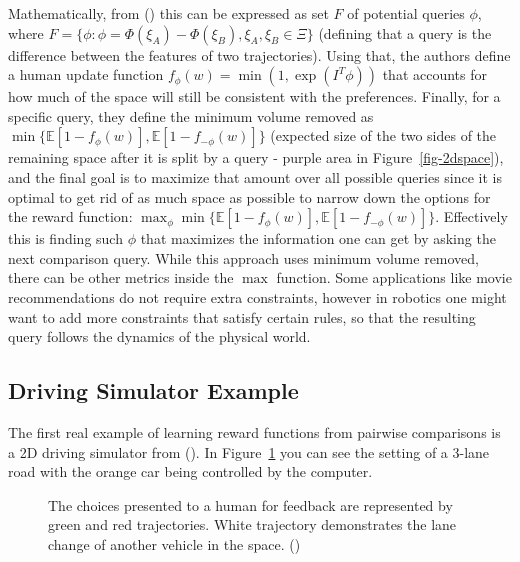 \documentclass[
  letterpaper,
  numbers=noenddot,
  DIV=11,
  oneside]{scrreprt}
\theoremstyle{remark}
\begin{document}
Mathematically, from () this can be expressed as set \(F\) of potential queries \(\phi\),
where
\(F = \{\phi: \phi = \Phi(\xi_A) - \Phi(\xi_B), \xi_A, \xi_B \in \Xi\}\)
(defining that a query is the difference between the features of two
trajectories). Using that, the authors define a human update function
\(f_{\phi}(w) = \min(1, \exp(I^T\phi))\) that accounts for how much of
the space will still be consistent with the preferences. Finally, for a
specific query, they define the minimum volume removed as
\(\min\{\mathbb{E}[1 - f_{\phi}(w)], \mathbb{E}[1 - f_{-\phi}(w)]\}\)
(expected size of the two sides of the remaining space after it is split
by a query - purple area in Figure~\ref{fig-2dspace}), and the final
goal is to maximize that amount over all possible queries since it is
optimal to get rid of as much space as possible to narrow down the
options for the reward function:
\(\max_{\phi} \min\{ \mathbb{E}[1 - f_{\phi}(w)], \mathbb{E}[1 - f_{-\phi}(w)]\}\).
Effectively this is finding such \(\phi\) that maximizes the information
one can get by asking the next comparison query. While this approach
uses minimum volume removed, there can be other metrics inside the
\(\max\) function. Some applications like movie recommendations do not
require extra constraints, however in robotics one might want to add
more constraints that satisfy certain rules, so that the resulting query
follows the dynamics of the physical world.

\subsection{Driving Simulator Example}\label{driving-simulator-example}

The first real example of learning reward functions from pairwise
comparisons is a 2D driving simulator from
(). In
Figure~\ref{fig-car_direct} you can see the setting of a 3-lane road
with the orange car being controlled by the computer.

\begin{figure}


\caption{\label{fig-car_direct}The choices presented to a human for
feedback are represented by green and red trajectories. White trajectory
demonstrates the lane change of another vehicle in the space.
()}

\end{figure}%
\end{document}
